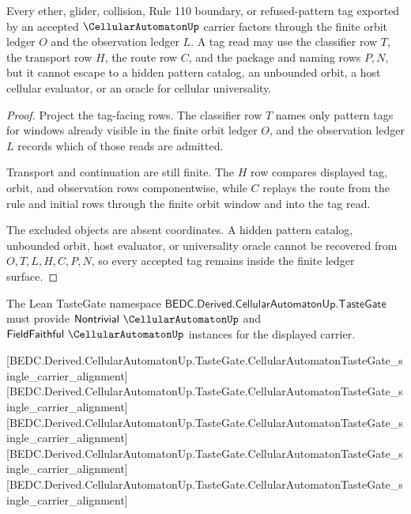 \begin{theorem}
\label{thm:cellular-automaton-pattern-tag-nonescape}
Every ether, glider, collision, Rule 110 boundary, or refused-pattern tag exported by an accepted $\CellularAutomatonUp$ carrier factors through the finite orbit ledger $O$ and the observation ledger $L$. A tag read may use the classifier row $T$, the transport row $H$, the route row $C$, and the package and naming rows $P,N$, but it cannot escape to a hidden pattern catalog, an unbounded orbit, a host cellular evaluator, or an oracle for cellular universality.
\end{theorem}
\begin{proof}
Project the tag-facing rows. The classifier row $T$ names only pattern tags for windows already visible in the finite orbit ledger $O$, and the observation ledger $L$ records which of those reads are admitted.

Transport and continuation are still finite. The $H$ row compares displayed tag, orbit, and observation rows componentwise, while $C$ replays the route from the rule and initial rows through the finite orbit window and into the tag read.

The excluded objects are absent coordinates. A hidden pattern catalog, unbounded orbit, host evaluator, or universality oracle cannot be recovered from $O,T,L,H,C,P,N$, so every accepted tag remains inside the finite ledger surface.
\end{proof}

The Lean TasteGate namespace $\mathsf{BEDC.Derived.CellularAutomatonUp.TasteGate}$ must provide $\mathsf{Nontrivial}\ \CellularAutomatonUp$ and $\mathsf{FieldFaithful}\ \CellularAutomatonUp$ instances for the displayed carrier.

[BEDC.Derived.CellularAutomatonUp.TasteGate.CellularAutomatonTasteGate\_single\_carrier\_alignment]
[BEDC.Derived.CellularAutomatonUp.TasteGate.CellularAutomatonTasteGate\_single\_carrier\_alignment]
[BEDC.Derived.CellularAutomatonUp.TasteGate.CellularAutomatonTasteGate\_single\_carrier\_alignment]
[BEDC.Derived.CellularAutomatonUp.TasteGate.CellularAutomatonTasteGate\_single\_carrier\_alignment]
[BEDC.Derived.CellularAutomatonUp.TasteGate.CellularAutomatonTasteGate\_single\_carrier\_alignment]

